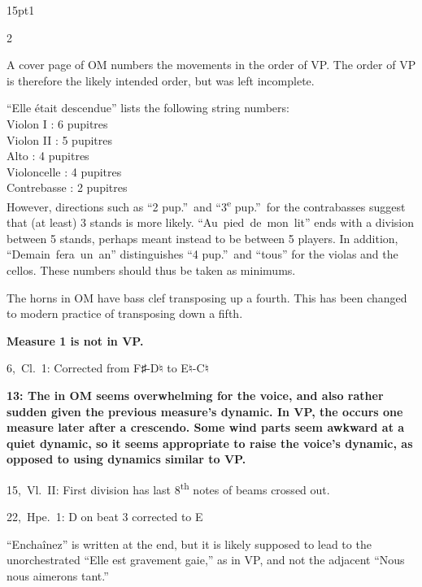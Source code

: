 \documentclass[twoside]{article}
\newcommand\dynmark[1]{\scalebox{0.9}{#1}{\kern1pt}}
\newcommand{\myuline}[1]{%
  \uline{\phantom{#1}}%
  \llap{\contour{white}{#1}}%
}
\begin{document}
\begin{hangparas}{15pt}{1}
\begin{multicols}{2}

A cover page of OM numbers the movements in the order of VP. The order of VP is therefore the likely intended order, but was left incomplete.

``Elle était descendue'' lists the following string numbers:\\
\hspace*{15pt}Violon I : 6 pupitres\\
\hspace*{15pt}Violon II : 5 pupitres\\
\hspace*{15pt}Alto : 4 pupitres\\
\hspace*{15pt}Violoncelle : 4 pupitres\\
\hspace*{15pt}Contrebasse : 2 pupitres\\
However, directions such as ``2 pup.''\ and ``3\textsuperscript{e} pup.''\ for the contrabasses suggest that (at least) 3 stands is more likely. \mbox{``Au pied de mon lit''} ends with a division between 5 stands, perhaps meant instead to be between 5 players. In addition, \mbox{``Demain fera un an''} distinguishes ``4 pup.''\ and ``tous'' for the violas and the cellos. These numbers should thus be taken as minimums.

The horns in OM have bass clef transposing up a fourth. This has been changed to modern practice of transposing down a fifth.

\myuline{Elle était descendue}

\textbf{Measure 1 is not in VP.}

\mbox{6, Cl. 1}: Corrected from F♯-D♮ to E♮-C♮

\textbf{\mbox{13}: The \dynmark{\mf} in OM seems overwhelming for the voice, and also rather sudden given the previous measure's \dynmark{\p} dynamic. In VP, the \dynmark{\mf} occurs one measure later after a crescendo. Some wind parts seem awkward at a quiet dynamic, so it seems appropriate to raise the voice's dynamic, as opposed to using dynamics similar to VP.}

\mbox{15, Vl. II}: First division has last 8\textsuperscript{th} notes of beams crossed out.

\mbox{22, Hpe. 1}: D on beat 3 corrected to E

``Enchaînez'' is written at the end, but it is likely supposed to lead to the unorchestrated ``Elle est gravement gaie,'' as in VP, and not the adjacent ``Nous nous aimerons tant.''


\end{multicols}
\end{hangparas}
\end{document}
